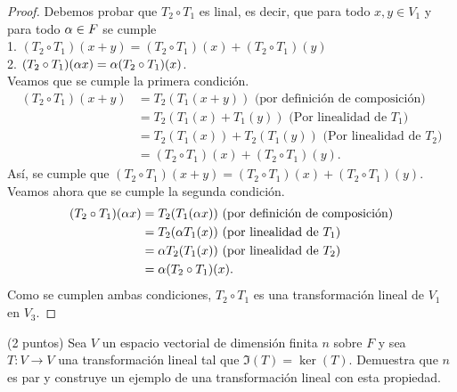 \documentclass[12pt,a4paper]{article}
\begin{document}
    \begin{proof}
        Debemos probar que $T_{2}\circ T_{1}$ es linal, es decir, que para todo $x,y\in V_{1}$ y para todo
        $\alpha\in F$ se cumple\\
        1. $(T_{2}\circ T_{1})(x+y)=(T_{2}\circ T_{1})(x)+(T_{2}\circ T_{1})(y)$\\
        2. $(T_{2}\circ T_{1})(\alpha x)=\alpha(T_{2}\circ T_{1})(x)$.\\
        Veamos que se cumple la primera condición.
        \begin{align*}
            (T_{2}\circ T_{1})(x+y)&=T_{2}(T_{1}(x+y))\text{ (por definición de composición)}\\
            &=T_{2}(T_{1}(x)+T_{1}(y))\text{ (Por linealidad de $T_{1}$)}\\
            &=T_{2}(T_{1}(x))+T_{2}(T_{1}(y))\text{ (Por linealidad de $T_{2}$)}\\
            &=(T_{2}\circ T_{1})(x)+(T_{2}\circ T_{1})(y).
        \end{align*}
        Así, se cumple que $(T_{2}\circ T_{1})(x+y)=(T_{2}\circ T_{1})(x)+(T_{2}\circ T_{1})(y)$.
        Veamos ahora que se cumple la segunda condición.
        \begin{align*}
            (T_{2}\circ T_{1})(\alpha x)&=T_{2}(T_{1}(\alpha x))\text{ (por definición de composición)}\\
            &=T_{2}(\alpha T_{1}(x))\text{ (por linealidad de $T_{1}$)}\\
            &=\alpha T_{2}(T_{1}(x))\text{ (por linealidad de $T_{2}$)}\\
            &=\alpha(T_{2}\circ T_{1})(x).
        \end{align*}
        Como se cumplen ambas condiciones, $T_{2}\circ T_{1}$ es una transformación lineal de $V_{1}$ en $V_{3}$.
    \end{proof}

    \begin{mdframed}[style=mdpinkbox,frametitle={Ejercicio 5}]
        (2 puntos) Sea $V$ un espacio vectorial de dimensión finita $n$ sobre $F$ y sea $T:V\to V$
        una transformación lineal tal que $\Im(T)=\ker(T)$. Demuestra que $n$ es par y construye un ejemplo
        de una transformación lineal con esta propiedad.
    \end{mdframed}
    
\end{document}

